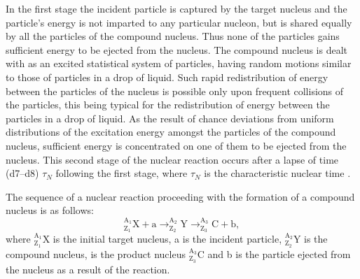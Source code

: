 In the first stage the incident particle is captured by the target nucleus and the particle's energy is not imparted to any particular nucleon, but is shared equally by all the particles of the compound nucleus. Thus none of the particles gains sufficient energy to be ejected from the nucleus. The compound nucleus is dealt with as an excited statistical system of particles, having random motions similar to those of particles in a drop of liquid.
Such rapid redistribution of energy between the particles of the nucleus is possible only upon frequent collisions of the particles, this being typical for the redistribution of energy between the particles in a drop of liquid. As the result of chance deviations from uniform distributions of the excitation energy amongst the particles of the compound nucleus, sufficient energy is concentrated on one of them to be ejected from the nucleus. This second stage of the nuclear reaction occurs after a lapse of time (\numrange{d7}{d8}) $\tau_{N}$ following the first stage, where $\tau_{N}$  is the characteristic nuclear time .

The sequence of a nuclear reaction proceeding with the formation of a compound nucleus is as follows:
\begin{equation*}%
^{\mathrm{A}_{1}}_{\mathrm{Z}_{1}}\mathrm{X} + \mathrm{a} \to ^{\mathrm{A}_{2}}_{\mathrm{Z}_{2}}\mathrm{Y} \to ^{\mathrm{A}_{3}}_{\mathrm{Z}_{3}}\mathrm{C} + \mathrm{b},
\end{equation*}
where $^{\mathrm{A}_{1}}_{\mathrm{Z}_{1}}\mathrm{X}$ is the initial target nucleus, a is the incident particle, $^{\mathrm{A}_{2}}_{\mathrm{Z}_{2}}\mathrm{Y}$ is the compound nucleus, is the product nucleus $^{\mathrm{A}_{3}}_{\mathrm{Z}_{3}}\mathrm{C}$ and b is the particle ejected from the nucleus as a result of the reaction.

